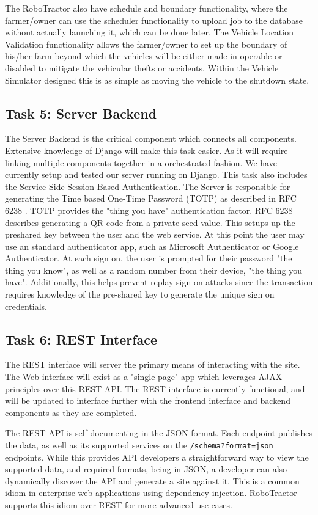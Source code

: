 \documentclass[conference,12pt]{IEEEtran}
\begin{document}
The RoboTractor also have schedule and boundary functionality, where the farmer/owner can use the scheduler functionality to upload job to the database without actually launching it, which can be done later. The Vehicle Location Validation functionality allows the farmer/owner to set up the boundary of his/her farm beyond which the vehicles will be either made in-operable or disabled to mitigate the vehicular thefts or accidents. Within the Vehicle Simulator designed this is as simple as moving the vehicle to the shutdown state. 

\subsection{Task 5: Server Backend}
The Server Backend is the critical component which connects all components.
Extensive knowledge of Django will make this task easier. As it will require
linking multiple components together in a orchestrated fashion. We have
currently setup and tested our server running on Django.
This task also includes the Service Side Session-Based Authentication. The
Server is responsible for generating the Time based One-Time Password (TOTP) as described in RFC 6238 \autocite{rydell_totp_2011}. TOTP provides the "thing you have"
authentication factor. RFC 6238 describes generating a QR code from a private
seed value. This setups up the preshared key between the user and the web
service. At this point the user may use an standard authenticator app, such as
Microsoft Authenticator or Google Authenticator. At each sign on, the user is
prompted for their password "the thing you know", as well as a random number
from their device, "the thing you have".  Additionally, this helps prevent
replay sign-on attacks since the transaction requires knowledge of the
pre-shared key to generate the unique sign on credentials.

\subsection{Task 6: REST Interface}
The REST interface will server the primary means of interacting with the site.
The Web interface will exist as a "single-page" app which leverages AJAX
principles over this REST API. The REST interface is currently functional, and
will be updated to interface further with the frontend interface and backend
components as they are completed.

The REST API is self documenting in the JSON format. Each endpoint publishes the
data, as well as its supported services on the \texttt{/schema?format=json}
endpoints. While this provides API developers a straightforward way to view the
supported data, and required formats, being in JSON, a developer can also
dynamically discover the API and generate a site against it.  This is a common
idiom in enterprise web applications using dependency injection.  RoboTractor
supports this idiom over REST for more advanced use cases.
\end{document}
